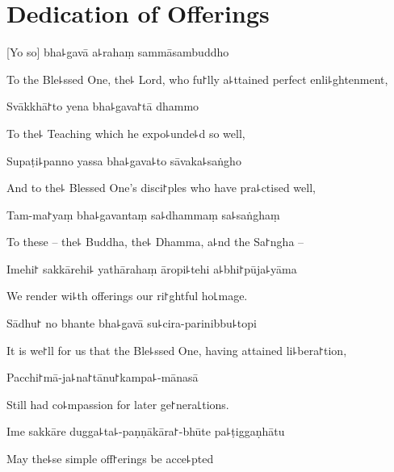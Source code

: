 
\chapter{Dedication of Offerings}                   %

[Yo so] bha꜕gavā a꜕rahaṃ sammāsambuddho

\begin{english}
To the Ble꜕ssed One, the꜕ Lord, who fu꜓lly a꜕ttained perfect enli꜕ghtenment,
\end{english}

Svākkhā꜓to yena bha꜕gava꜓tā dhammo

\begin{english}
To the꜕ Teaching which he expo꜕unde꜕d so well,
\end{english}

Supaṭi꜕panno yassa bha꜕gava꜕to sāvaka꜕saṅgho

\begin{english}
And to the꜕ Blessed One's disci꜓ples who have pra꜕ctised well,
\end{english}

Tam-ma꜓yaṃ bha꜕gavantaṃ sa꜕dhammaṃ sa꜕saṅghaṃ

\begin{english}
To these -- the꜕ Buddha, the꜕ Dhamma, a꜕nd the Sa꜓ngha --
\end{english}

Imehi꜓ sakkārehi꜕ yathārahaṃ āropi꜕tehi a꜕bhi꜓pūja꜕yāma

\begin{english}
We render wi꜕th offerings our ri꜓ghtful ho꜖mage.
\end{english}

Sādhu꜓ no bhante bha꜕gavā su꜕cira-parinibbu꜕topi

\begin{english}
It is we꜓ll for us that the Ble꜕ssed One, having attained li꜕bera꜓tion,
\end{english}

Pacchi꜓mā-ja꜕na꜓tānu꜓kampa꜕-mānasā

\begin{english}
Still had co꜕mpassion for later ge꜓nera꜖tions.
\end{english}

Ime sakkāre dugga꜕ta꜕-paṇṇākāra꜓-bhūte pa꜕ṭiggaṇhātu

\begin{english}
May the꜕se simple off꜓erings be acce꜕pted
\end{english}

